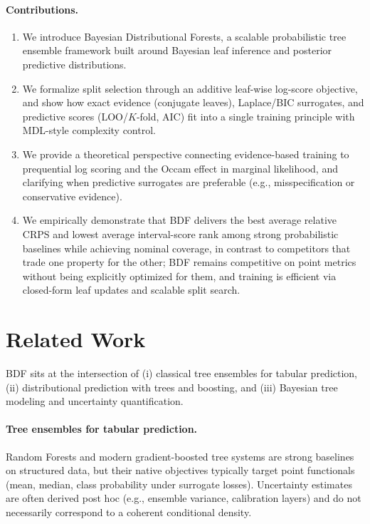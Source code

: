 \documentclass[twoside,11pt]{article}
\begin{document}
\paragraph{Contributions.}
\begin{enumerate}
\item We introduce Bayesian Distributional Forests, a scalable probabilistic tree ensemble framework built around Bayesian leaf inference and posterior predictive distributions.
\item We formalize split selection through an additive leaf-wise log-score objective, and show how exact evidence (conjugate leaves), Laplace/BIC surrogates, and predictive scores (LOO/$K$-fold, AIC) fit into a single training principle with MDL-style complexity control.
\item We provide a theoretical perspective connecting evidence-based training to prequential log scoring and the Occam effect in marginal likelihood, and clarifying when predictive surrogates are preferable (e.g., misspecification or conservative evidence).
\item We empirically demonstrate that BDF delivers the best average relative CRPS and lowest average interval-score rank among strong probabilistic baselines while achieving nominal coverage, in contrast to competitors that trade one property for the other; BDF remains competitive on point metrics without being explicitly optimized for them, and training is efficient via closed-form leaf updates and scalable split search.
\end{enumerate}

\section{Related Work}\label{sec:related-work}

BDF sits at the intersection of (i) classical tree ensembles for tabular prediction, (ii) distributional prediction with trees and boosting, and (iii) Bayesian tree modeling and uncertainty quantification.

\paragraph{Tree ensembles for tabular prediction.}
Random Forests \citep{breiman2001random} and modern gradient-boosted tree systems \citep{friedman2001greedy,chen2016xgboost,ke2017lightgbm} are strong baselines on structured data, but their native objectives typically target point functionals (mean, median, class probability under surrogate losses). Uncertainty estimates are often derived post hoc (e.g., ensemble variance, calibration layers) and do not necessarily correspond to a coherent conditional density.
\end{document}
